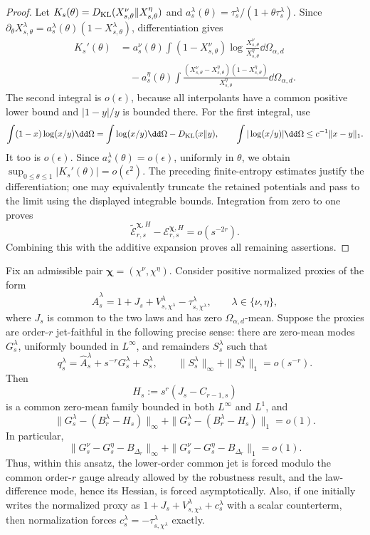 \begin{proof}
Let \(K_s(\theta)=D_{\rm KL}(X_{s,\theta}^\nu
\|X_{s,\theta}^\eta)\) and
\(a_s^\lambda(\theta)=\tau_s^\lambda/(1+\theta\tau_s^\lambda)\).
Since
\(\partial_\theta X_{s,\theta}^\lambda
=a_s^\lambda(\theta)(1-X_{s,\theta}^\lambda)\), differentiation gives
\begin{align*}
 K_s'(\theta)
 &=a_s^\nu(\theta)\int(1-X_{s,\theta}^\nu)
       \log\frac{X_{s,\theta}^\nu}{X_{s,\theta}^\eta}
       \dd\Omega_{\alpha,d}\\
 &\quad-a_s^\eta(\theta)\int
       \frac{(X_{s,\theta}^\nu-X_{s,\theta}^\eta)
             (1-X_{s,\theta}^\eta)}{X_{s,\theta}^\eta}
       \dd\Omega_{\alpha,d}.
\end{align*}
The second integral is \(o(\epsilon)\), because all interpolants have a
common positive lower bound and \(|1-y|/y\) is bounded there.  For the first
integral, use
\[
 \int(1-x)\log(x/y)\dd\Omega
 =\int\log(x/y)\dd\Omega-D_{\rm KL}(x\|y),
 \qquad
 \int|\log(x/y)|\dd\Omega\le c^{-1}\|x-y\|_1.
\]
It too is \(o(\epsilon)\).  Since
\(a_s^\lambda(\theta)=o(\epsilon)\), uniformly in \(\theta\), we obtain
\(\sup_{0\le\theta\le1}|K_s'(\theta)|=o(\epsilon^2)\).
The preceding finite-entropy estimates justify the differentiation; one may
equivalently truncate the retained potentials and pass to the limit using
the displayed integrable bounds.  Integration from zero to one proves
\[
 \widetilde{\mathcal E}_{r,s}^{\boldsymbol\chi,H}
 -\mathcal E_{r,s}^{\boldsymbol\chi,H}=o(s^{-2r}).
\]
Combining this with the additive expansion proves all remaining assertions.
\end{proof}

\begin{unnumberedproposition}
Fix an admissible pair \(\boldsymbol\chi=(\chi^\nu,\chi^\eta)\).  Consider
positive normalized
proxies of the form
\[
 \widehat A_s^\lambda=1+J_s+V_{s,\chi^\lambda}^\lambda-
                         \tau_{s,\chi^\lambda}^\lambda,
 \qquad \lambda\in\{\nu,\eta\},
\]
where \(J_s\) is common to the two laws and has zero
\(\Omega_{\alpha,d}\)-mean.  Suppose the proxies are order-\(r\)
jet-faithful in the following precise sense: there are zero-mean modes
\(G_s^\lambda\), uniformly bounded in \(L^\infty\), and remainders
\(S_s^\lambda\) such that
\[
 q_s^\lambda=\widehat A_s^\lambda+s^{-r}G_s^\lambda+S_s^\lambda,
 \qquad
 \|S_s^\lambda\|_\infty+\|S_s^\lambda\|_1=o(s^{-r}).
\]
Then
\[
 H_s:=s^r(J_s-C_{r-1,s})
\]
is a common zero-mean family bounded in both \(L^\infty\) and \(L^1\), and
\[
 \|G_s^\lambda-(B_r^\lambda-H_s)\|_\infty
 +\|G_s^\lambda-(B_r^\lambda-H_s)\|_1=o(1).
\]
In particular,
\[
 \|G_s^\nu-G_s^\eta-B_{\Delta_r}\|_\infty
 +\|G_s^\nu-G_s^\eta-B_{\Delta_r}\|_1=o(1).
\]
Thus, within this ansatz, the lower-order common jet is forced modulo the
common order-\(r\) gauge already allowed by the robustness result, and the
law-difference mode, hence its Hessian, is forced asymptotically.  Also, if
one initially writes the normalized proxy as
\(1+J_s+V_{s,\chi^\lambda}^\lambda+c_s^\lambda\) with a scalar
counterterm, then normalization forces
\(c_s^\lambda=-\tau_{s,\chi^\lambda}^\lambda\) exactly.
\end{unnumberedproposition}

